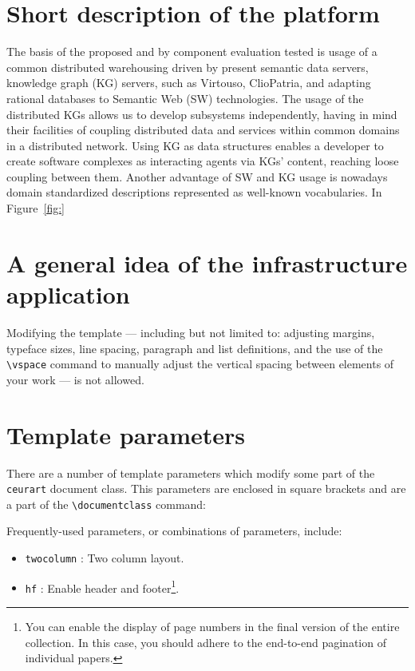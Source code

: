 \documentclass[
]{ceurart}
\begin{document}
\section{Short description of the platform}

The basis of the proposed and by component evaluation tested is usage of a common distributed warehousing driven by present semantic data servers, knowledge graph (KG) servers, such as Virtouso, ClioPatria, and adapting rational databases to Semantic Web (SW) technologies.  The usage of the distributed KGs allows us to develop subsystems independently, having in mind their facilities of coupling distributed data and services within common domains in a distributed network.  Using KG as data structures enables a developer to create software complexes as interacting agents via KGs' content, reaching loose coupling between them.  Another advantage of SW and KG usage is nowadays domain standardized descriptions represented as well-known vocabularies.  In Figure~\ref{fig:}



\section{A general idea of the infrastructure application}

Modifying the template --- including but not limited to: adjusting
margins, typeface sizes, line spacing, paragraph and list definitions,
and the use of the \verb|\vspace| command to manually adjust the
vertical spacing between elements of your work --- is not allowed.

\section{Template parameters}

There are a number of template
parameters which modify some part of the \verb|ceurart| document class.
This parameters are enclosed in square
brackets and are a part of the \verb|\documentclass| command:


Frequently-used parameters, or combinations of parameters, include:
\begin{itemize}
\item \verb|twocolumn| : Two column layout.
\item \verb|hf| : Enable header and footer\footnote{You can enable
    the display of page numbers in the final version of the entire
    collection. In this case, you should adhere to the end-to-end
    pagination of individual papers.}.
\end{itemize}
\end{document}
